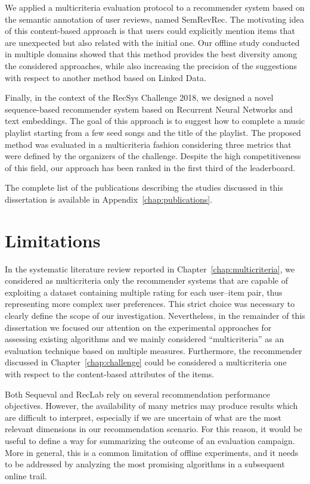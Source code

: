 We applied a multicriteria evaluation protocol to a recommender system based on the semantic annotation of user reviews, named SemRevRec. The motivating idea of this content-based approach is that users could explicitly mention items that are unexpected but also related with the initial one. Our offline study conducted in multiple domains showed that this method provides the best diversity among the considered approaches, while also increasing the precision of the suggestions with respect to another method based on Linked Data.

Finally, in the context of the RecSys Challenge 2018, we designed a novel sequence-based recommender system based on Recurrent Neural Networks and text embeddings. The goal of this approach is to suggest how to complete a music playlist starting from a few seed songs and the title of the playlist. The proposed method was evaluated in a multicriteria fashion considering three metrics that were defined by the organizers of the challenge. Despite the high competitiveness of this field, our approach has been ranked in the first third of the leaderboard.

The complete list of the publications describing the studies discussed in this dissertation is available in Appendix~\ref{chap:publications}.

\section{Limitations}

In the systematic literature review reported in Chapter~\ref{chap:multicriteria}, we considered as multicriteria only the recommender systems that are capable of exploiting a dataset containing multiple rating for each user--item pair, thus representing more complex user preferences. This strict choice was necessary to clearly define the scope of our investigation. Nevertheless, in the remainder of this dissertation we focused our attention on the experimental approaches for assessing existing algorithms and we mainly considered ``multicriteria'' as an evaluation technique based on multiple measures. Furthermore, the recommender discussed in Chapter~\ref{chap:challenge} could be considered a multicriteria one with respect to the content-based attributes of the items.

Both Sequeval and RecLab rely on several recommendation performance objectives. However, the availability of many metrics may produce results which are difficult to interpret, especially if we are uncertain of what are the most relevant dimensions in our recommendation scenario. For this reason, it would be useful to define a way for summarizing the outcome of an evaluation campaign. More in general, this is a common limitation of offline experiments, and it needs to be addressed by analyzing the most promising algorithms in a subsequent online trail.

